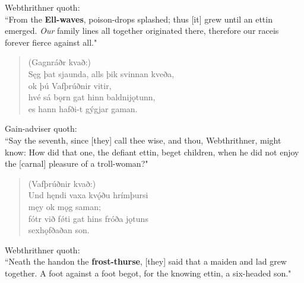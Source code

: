 \bvb Webthrithner quoth: \\ “From the \textbf{Ell-waves}, poison-drops splashed; thus [it] grew until an ettin emerged. \emph{Our} family lines all together originated there, therefore our race\footnotemark[45] is forever fierce against all.\footnotemark[46]" \\

\begin{verse}
(Gagnráðr kvað:) \\%
\bva Sęg þat sjaunda, \hld alls þik svinnan kveða, \\%
\ind ok þú Vafþrúðnir vitir, \\%
hvé sá bǫrn gat \hld hinn baldni\footnotemark[25] jǫtunn, \\%
\ind es hann hafði-t gýgjar gaman.\\%
\end{verse}

\bvb Gain-adviser quoth: \\ “Say the seventh, since [they] call thee wise, and thou, Webthrithner, might know: How did that one, the defiant ettin, beget children, when he did not enjoy the [carnal] pleasure of a troll-woman?" \\

\begin{verse}
(Vafþrúðnir kvað:) \\%
\bva Und hęndi vaxa \hld kvǫ́ðu hrímþursi \\%
\ind męy ok mǫg saman; \\%
fótr við fǿti \hld gat hins fróða jǫtuns \\%
\ind sexhǫfðaðan son.\\%
\end{verse}

\bvb Webthrithner quoth: \\ “Neath the hand\footnotemark[50] on the \textbf{frost-thurse}, [they] said that a maiden and lad grew together. A foot against a foot begot, for the knowing ettin, a six-headed son." \\

